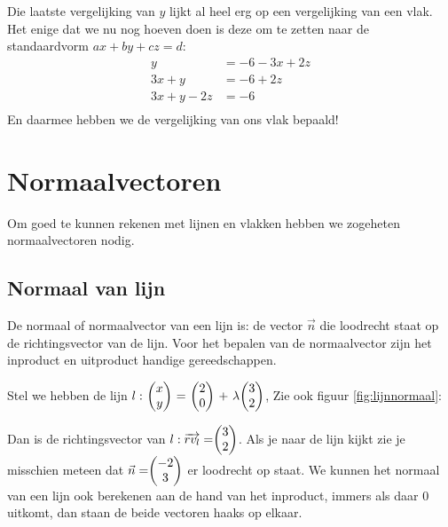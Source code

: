 Die laatste vergelijking van $y$ lijkt al heel erg op een vergelijking van een vlak. Het enige dat we nu nog hoeven doen is deze om te zetten naar de standaardvorm $ax + by + cz = d$:
\begin{align*}
  y &= -6 -3x + 2z \\
  3x + y &= -6 + 2z \\
  3x + y - 2z &= -6 \\
\end{align*}
En daarmee hebben we de vergelijking van ons vlak bepaald!

\newpage
\section{Normaalvectoren}
Om goed te kunnen rekenen met lijnen en vlakken hebben we zogeheten normaalvectoren nodig.

\subsection{Normaal van lijn}
{De normaal of normaalvector van een lijn is: de vector $\vec{n} $ die loodrecht staat op de richtingsvector van de lijn.} Voor het bepalen van de normaalvector zijn het inproduct en uitproduct handige gereedschappen. 

Stel we hebben de lijn $l:\ \vectwee{x}{y} \ = \ \vectwee{2}{0} \ +\ \lambda \vectwee{3}{2} $, Zie ook figuur \ref{fig:lijnnormaal}:


Dan is de richtingsvector van $ l:  \overrightarrow{rv_{l}} =  \vectwee {3}{2} $. Als je naar de lijn kijkt zie je misschien meteen dat $ \vec{n} =  \vectwee {-2}{3} $ er loodrecht op staat. 
We kunnen het normaal van een lijn ook berekenen aan de hand van het inproduct, immers als daar $0$ uitkomt, dan staan de beide vectoren haaks op elkaar. 

